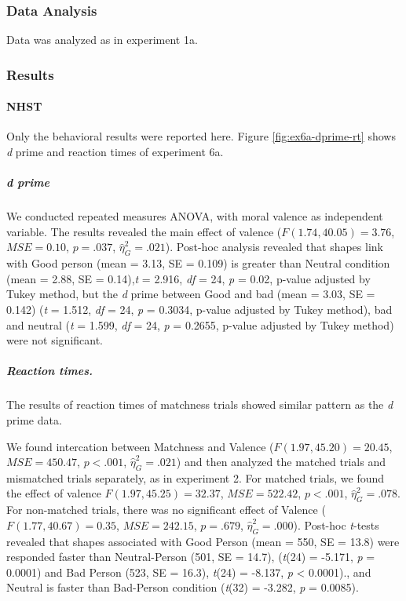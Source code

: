 \documentclass[
  english,
  man]{apa6}
\let\oldparagraph\paragraph
\renewcommand{\paragraph}[1]{\oldparagraph{#1}\mbox{}}
\let\oldsubparagraph\subparagraph
\renewcommand{\subparagraph}[1]{\oldsubparagraph{#1}\mbox{}}
\begin{document}
\hypertarget{data-analysis-5}{%
\subsubsection{Data Analysis}\label{data-analysis-5}}

Data was analyzed as in experiment 1a.

\hypertarget{results-4}{%
\subsubsection{Results}\label{results-4}}

\hypertarget{nhst-2}{%
\paragraph{NHST}\label{nhst-2}}

Only the behavioral results were reported here. Figure \ref{fig:ex6a-dprime-rt} shows \emph{d} prime and reaction times of experiment 6a.

\hypertarget{d-prime-2}{%
\subparagraph{d prime}\label{d-prime-2}}

We conducted repeated measures ANOVA, with moral valence as independent variable. The results revealed the main effect of valence (\(F(1.74, 40.05) = 3.76\), \(\mathit{MSE} = 0.10\), \(p = .037\), \(\hat{\eta}^2_G = .021\)). Post-hoc analysis revealed that shapes link with Good person (mean = 3.13, SE = 0.109) is greater than Neutral condition (mean = 2.88, SE = 0.14),\emph{t} = 2.916, \emph{df} = 24, \emph{p} = 0.02, p-value adjusted by Tukey method, but the \emph{d} prime between Good and bad (mean = 3.03, SE = 0.142) (\emph{t} = 1.512, \emph{df} = 24, \emph{p} = 0.3034, p-value adjusted by Tukey method), bad and neutral (\emph{t} = 1.599, \emph{df} = 24, \emph{p} = 0.2655, p-value adjusted by Tukey method) were not significant.

\hypertarget{reaction-times.}{%
\subparagraph{Reaction times.}\label{reaction-times.}}

The results of reaction times of matchness trials showed similar pattern as the \emph{d} prime data.

We found intercation between Matchness and Valence (\(F(1.97, 45.20) = 20.45\), \(\mathit{MSE} = 450.47\), \(p < .001\), \(\hat{\eta}^2_G = .021\)) and then analyzed the matched trials and mismatched trials separately, as in experiment 2. For matched trials, we found the effect of valence \(F(1.97, 45.25) = 32.37\), \(\mathit{MSE} = 522.42\), \(p < .001\), \(\hat{\eta}^2_G = .078\). For non-matched trials, there was no significant effect of Valence (\(F(1.77, 40.67) = 0.35\), \(\mathit{MSE} = 242.15\), \(p = .679\), \(\hat{\eta}^2_G = .000\)). Post-hoc \emph{t}-tests revealed that shapes associated with Good Person (mean = 550, SE = 13.8) were responded faster than Neutral-Person (501, SE = 14.7), (\emph{t}(24) = -5.171, \emph{p} = 0.0001) and Bad Person (523, SE = 16.3), \emph{t}(24) = -8.137, \emph{p} \textless{} 0.0001)., and Neutral is faster than Bad-Person condition (\emph{t}(32) = -3.282, \emph{p} = 0.0085).
\end{document}
